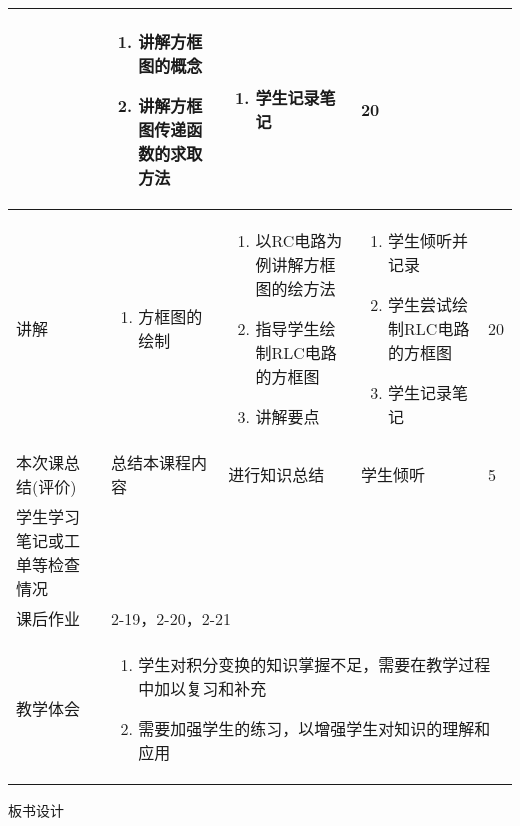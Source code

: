 {\begin{landscape}
\begin{longtable}{|m{10mm}|m{50mm}|m{50mm}|m{50mm}|m{15mm}|}
\begin{enumerate}
\end{enumerate}
 &\begin{enumerate}
\item 讲解方框图的概念
\item 讲解方框图传递函数的求取方法
\end{enumerate} &\begin{enumerate}
\item 学生记录笔记
\end{enumerate} &20 \\\hline
讲解&
\begin{enumerate}
\item 方框图的绘制
\end{enumerate}
 &\begin{enumerate}
\item 以RC电路为例讲解方框图的绘方法
\item 指导学生绘制RLC电路的方框图
\item 讲解要点
\end{enumerate} &\begin{enumerate}
\item 学生倾听并记录
\item 学生尝试绘制RLC电路的方框图
\item 学生记录笔记
\end{enumerate} &20 \\\hline
\centering 本次课总结(评价)&总结本课程内容 &进行知识总结 &学生倾听 &5 \\\hline
\centering 学生学习笔记或工单等检查情况&\multicolumn{4}{m{165mm}|}{\quad}\\\hline
\centering 课后作业&\multicolumn{4}{m{165mm}|}{2-19，2-20，2-21}\\\hline
\centering 教学体会&\multicolumn{4}{m{165mm}|}{\begin{enumerate}
\item 学生对积分变换的知识掌握不足，需要在教学过程中加以复习和补充
\item 需要加强学生的练习，以增强学生对知识的理解和应用
\end{enumerate}}
\end{longtable}

\end{landscape}
\clearpage
\begin{center}
{\huge 板书设计}
\end{center}
}
